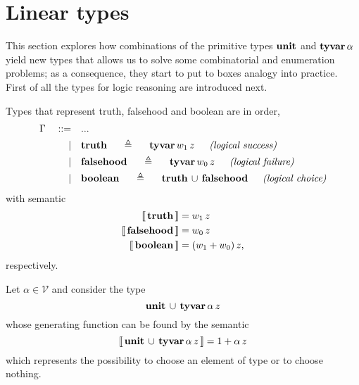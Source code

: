 \section{Linear types}

This section explores how combinations of the primitive types $\textbf{unit}$ and
$\textbf{tyvar}\,\alpha$ yield new types that allows us to solve some combinatorial and
enumeration problems; as a consequence, they start to put to boxes analogy into
practice. First of all the types for logic reasoning are introduced next.

\begin{definition}[\tytruth, \tyfalsehood, \tyboolean]
Types that represent truth, falsehood and boolean are in order,
\begin{displaymath}
\begin{split}
    \Gamma\quad::=\quad&... \\
           |\quad&\tydef{\tytruth}{\tyvar{w_{1}\,z}}{logical success}\\
           |\quad&\tydef{\tyfalsehood}{\tyvar{w_{0}\,z}}{logical failure}\\
           |\quad&\tydef{\tyboolean}{\tydu{\tytruth}{\tyfalsehood}}{logical choice}\\
\end{split}
\end{displaymath}
with semantic
\begin{displaymath}
\begin{split}
    \left\llbracket\,\textbf{truth}\,\right\rrbracket &= w_{1}\,z\\
    \left\llbracket\,\textbf{falsehood}\,\right\rrbracket &= w_{0}\,z\\
    \left\llbracket\,\textbf{boolean}\,\right\rrbracket &= (w_{1} + w_{0})\,z,
\end{split}
\end{displaymath}
respectively.
\end{definition}

\begin{example}
Let $\alpha\in\mathcal{V}$ and consider the type
\begin{displaymath}
    \textbf{unit}\,\cup\,\textbf{tyvar}\,\alpha\,z
\end{displaymath}
whose generating function can be found by the semantic
\begin{displaymath}
    \left\llbracket\,\textbf{unit}\,\cup\,\textbf{tyvar}\,\alpha\,z\,\right\rrbracket = 1 + \alpha\,z
\end{displaymath}
which represents the possibility to choose an element of type \tyvar{\alpha} or
to choose nothing.
\end{example}

